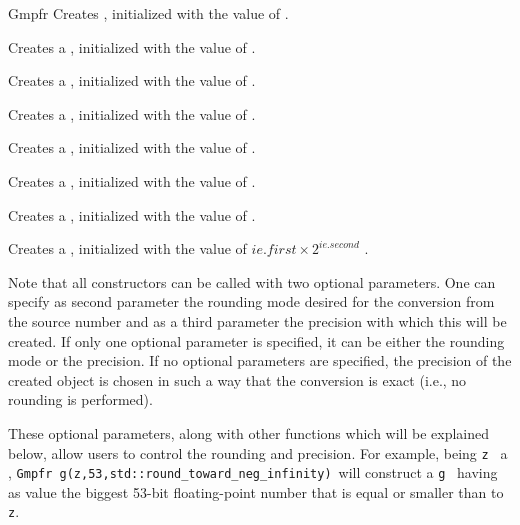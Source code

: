 \begin{ccRefClass} {Gmpfr}
        {Creates , initialized with the value of .}

        {Creates a , initialized with the value of .}

        {Creates a , initialized with the value of .}

        {Creates a , initialized with the value of .}

        {Creates a , initialized with the value of .}

        {Creates a , initialized with the value of .}

        {Creates a , initialized with the value of .}

        {Creates a , initialized with the value of
        \( ie.first \times 2^{ie.second} \) .}

Note that all constructors can be called with two optional parameters.
One can specify as second parameter the rounding mode desired for
the conversion from the source number and as a third parameter the
precision with which this  will be created.  If only one
optional parameter is specified, it can be either the rounding mode
or the precision. If no optional parameters are specified, the
precision of the created object is chosen in such a way that the
conversion is exact (i.e., no rounding is performed).

These optional parameters, along with other functions which will be
explained below, allow users to control the rounding and precision.
For example, being \verb-z- \ a ,
\verb-Gmpfr g(z,53,std::round_toward_neg_infinity)-\ will construct a
 \verb-g- \ having as value the biggest 53-bit
floating-point number that is equal or smaller than to \verb-z-.



\end{ccRefClass}
